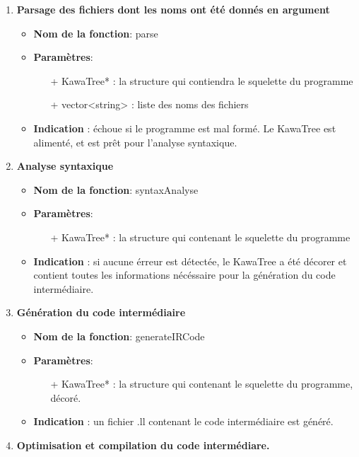 \documentclass{article}
\begin{document}
   \begin{enumerate}
   \item \textbf{Parsage des fichiers dont les noms ont été donnés en argument}
   \begin{itemize}
     \item \textbf{Nom de la fonction}: parse
     \item \textbf{Paramètres}:
     \begin{enumerate}
       \item[+] KawaTree* : la structure qui contiendra le squelette du programme 
       \item[+] vector<string> : liste des noms des fichiers
     \end{enumerate}
     \item \textbf{Indication} : échoue si le programme est mal formé. Le KawaTree est alimenté, et est prêt pour l'analyse syntaxique.  
   \end{itemize}

   \item \textbf{Analyse syntaxique}
   \begin{itemize}
     \item \textbf{Nom de la fonction}: syntaxAnalyse
     \item \textbf{Paramètres}:
     \begin{enumerate}
       \item[+] KawaTree* : la structure qui contenant le squelette du programme 
     \end{enumerate}
     \item \textbf{Indication} : si aucune érreur est détectée, le KawaTree a été décorer et contient toutes les informations nécéssaire pour la génération du code intermédiaire. 
   \end{itemize}

   \item \textbf{Génération du code intermédiaire}
   \begin{itemize}
     \item \textbf{Nom de la fonction}: generateIRCode
     \item \textbf{Paramètres}:
     \begin{enumerate}
       \item[+] KawaTree* : la structure qui contenant le squelette du programme, décoré.
     \end{enumerate}
     \item \textbf{Indication} : un fichier .ll contenant le code intermédiaire est généré.
   \end{itemize}

   \item \textbf{Optimisation et compilation du code intermédiare.}

   \end{enumerate}
\end{document}
